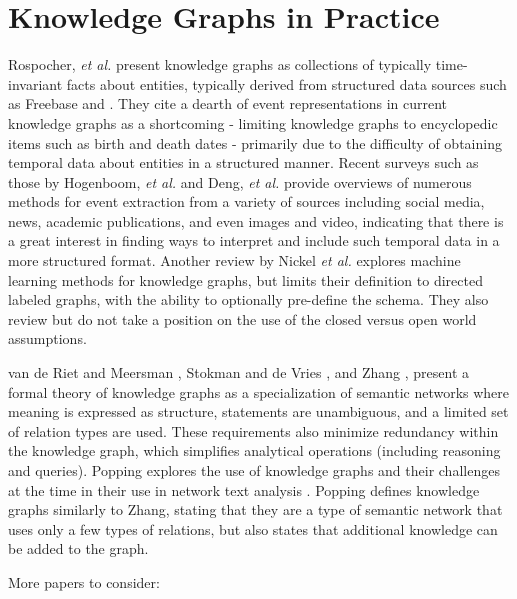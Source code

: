 \section{Knowledge Graphs in Practice}
Rospocher, \textit{et al.} present knowledge graphs as collections of typically time-invariant facts about entities, typically derived from structured data sources such as Freebase and \cite{Rospocher2016}. They cite a dearth of event representations in current knowledge graphs as a shortcoming - limiting knowledge graphs to encyclopedic items such as birth and death dates - primarily due to the difficulty of obtaining temporal data about entities in a structured manner. Recent surveys such as those by Hogenboom, \textit{et al.} \cite{Hogenboom2016} and Deng, \textit{et al.} \cite{Deng2015} provide overviews of numerous methods for event extraction from a variety of sources including social media, news, academic publications, and even images and video, indicating that there is a great interest in finding ways to interpret and include such temporal data in a more structured format.
Another review by Nickel \emph{et al.} explores machine learning methods for knowledge graphs, but limits their definition to directed labeled graphs, with the ability to optionally pre-define the schema.
They also review but do not take a position on the use of the closed versus open world assumptions.

van de Riet and Meersman \cite{van1992knowledge}, Stokman and de Vries \cite{Stokman_1988}, and Zhang \cite{zhang2002knowledge}, present a formal theory of knowledge graphs as a specialization of semantic networks where meaning is expressed as structure, statements are unambiguous, and a limited set of relation types are used.
These requirements also minimize redundancy within the knowledge graph, which simplifies analytical operations (including reasoning and queries).
Popping explores the use of knowledge graphs and their challenges at the time in their use in network text analysis \cite{Popping_2003}. 
Popping defines knowledge graphs similarly to Zhang, stating that they are a type of semantic network that uses only a few types of relations, but also states that additional knowledge can be added to the graph.

More papers to consider: \cite{Dieng_1992} \cite{Juel_Vang_2013}

